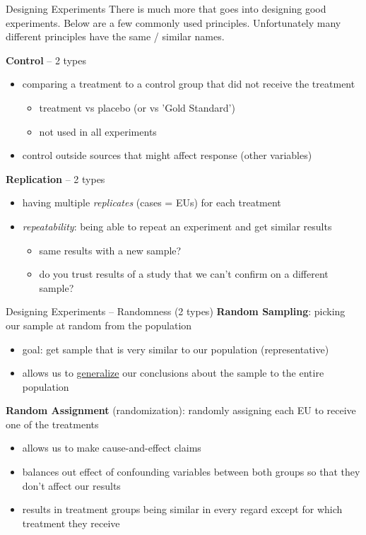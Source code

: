 \documentclass{beamer}
\begin{document}
\begin{frame}{Designing Experiments}
There is much more that goes into designing good experiments. Below are a few commonly used principles. Unfortunately many different principles have the same / similar names. \vspace{4mm}


\textbf{Control} -- 2 types
\begin{itemize}
    \item comparing a treatment to a control group that did not receive the treatment
        \begin{itemize}
            \item treatment vs placebo (or vs 'Gold Standard')
            \item not used in all experiments
        \end{itemize}
    \item control outside sources that might affect response (other variables)
\end{itemize} \vspace{4mm}

\textbf{Replication} -- 2 types
\begin{itemize}
    \item having multiple \textit{replicates} (cases = EUs) for each treatment
    \item \textit{repeatability}: being able to repeat an experiment and get similar results
        \begin{itemize}
            \item same results with a new sample?
            \item do you trust results of a study that we can't confirm on a different sample?
        \end{itemize}
\end{itemize}
\end{frame}



\begin{frame}{Designing Experiments -- Randomness (2 types)}
\textbf{Random Sampling}: picking our sample at random from the population
\begin{itemize}
    \item goal: get sample that is very similar to our population (representative)
    \item allows us to \underline{generalize} our conclusions about the sample to the entire population
\end{itemize} \vspace{4mm}

\textbf{Random Assignment} (randomization): randomly assigning each EU to receive one of the treatments
\begin{itemize}
    \item allows us to make cause-and-effect claims
    \item balances out effect of confounding variables between both groups so that they don't affect our results
    \item results in treatment groups being similar in every regard except for which treatment they receive
\end{itemize}
\end{frame}
\end{document}
